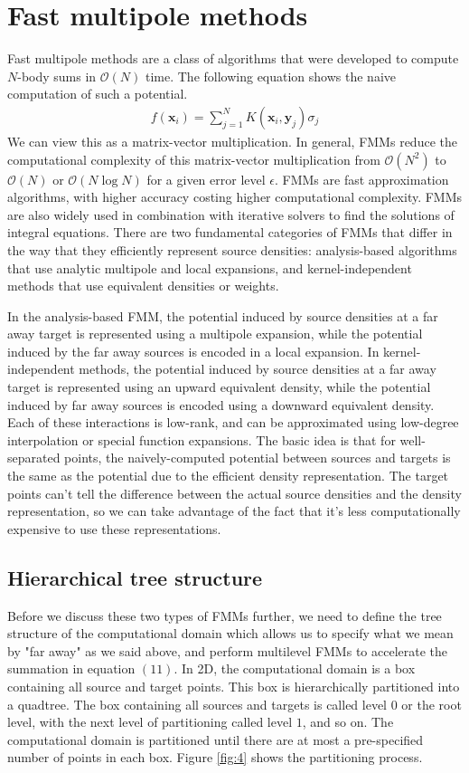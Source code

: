 \documentclass[11pt, oneside]{article}   	%
\begin{document}
\section{Fast multipole methods}
Fast multipole methods are a class of algorithms that were developed to compute $N$-body sums in $\mathcal{O}(N)$ time. The following equation shows the naive computation of such a potential.
\begin{align}
f(\mathbf{x}_i)=\sum_{j=1}^N K(\mathbf{x}_i,\mathbf{y}_j)\sigma_j
\end{align}
We can view this as a matrix-vector multiplication. In general, FMMs reduce the computational complexity of this matrix-vector multiplication from $\mathcal{O}(N^2)$ to $\mathcal{O}(N)$ or $\mathcal{O}(N\log N)$ for a given error level $\epsilon$. FMMs are fast approximation algorithms, with higher accuracy costing higher computational complexity. FMMs are also widely used in combination with iterative solvers to find the solutions of integral equations. There are two fundamental categories of FMMs that differ in the way that they efficiently represent source densities: analysis-based algorithms that use analytic multipole and local expansions, and kernel-independent methods that use equivalent densities or weights.

In the analysis-based FMM, the potential induced by source densities at a far away target is represented using a multipole expansion, while the potential induced by the far away sources is encoded in a local expansion. In kernel-independent methods, the potential induced by source densities at a far away target is represented using an upward equivalent density, while the potential induced by far away sources is encoded using a downward equivalent density. Each of these interactions is low-rank, and can be approximated using low-degree interpolation or special function expansions. The basic idea is that for well-separated points, the naively-computed potential between sources and targets is the same as the potential due to the efficient density representation. The target points can't tell the difference between the actual source densities and the density representation, so we can take advantage of the fact that it's less computationally expensive to use these representations.

\subsection{Hierarchical tree structure}
Before we discuss these two types of FMMs further, we need to define the tree structure of the computational domain which allows us to specify what we mean by "far away" as we said above, and perform multilevel FMMs to accelerate the summation in equation $(11)$. In 2D, the computational domain is a box containing all source and target points. This box is hierarchically partitioned into a quadtree. The box containing all sources and targets is called level $0$ or the root level, with the next level of partitioning called level $1$, and so on. The computational domain is partitioned until there are at most a pre-specified number of points in each box. Figure \ref{fig:4} shows the partitioning process.
\end{document}
